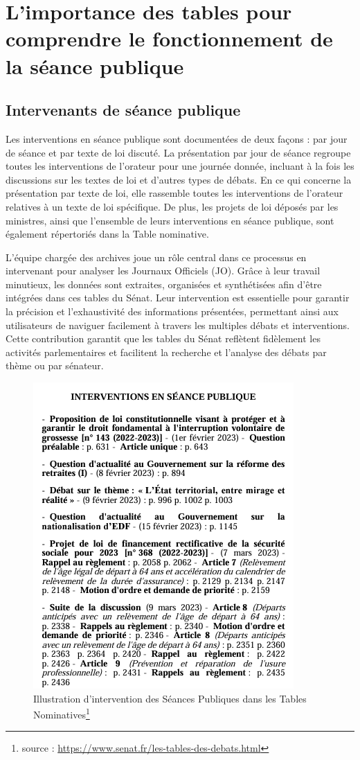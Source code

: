 \section{L'importance des tables pour comprendre le fonctionnement de la séance publique}
\subsection{Intervenants de séance publique}

Les interventions en séance publique sont documentées de deux façons : par jour de séance et par texte de loi discuté. La présentation par jour de séance regroupe toutes les interventions de l’orateur pour une journée donnée, incluant à la fois les discussions sur les textes de loi et d'autres types de débats. En ce qui concerne la présentation par texte de loi, elle rassemble toutes les interventions de l’orateur relatives à un texte de loi spécifique. De plus, les projets de loi déposés par les ministres, ainsi que l’ensemble de leurs interventions en séance publique, sont également répertoriés dans la Table nominative.

L’équipe chargée des archives joue un rôle central dans ce processus en intervenant pour analyser les Journaux Officiels (JO). Grâce à leur travail minutieux, les données sont extraites, organisées et synthétisées afin d'être intégrées dans ces tables du Sénat. Leur intervention est essentielle pour garantir la précision et l’exhaustivité des informations présentées, permettant ainsi aux utilisateurs de naviguer facilement à travers les multiples débats et interventions. Cette contribution garantit que les tables du Sénat reflètent fidèlement les activités parlementaires et facilitent la recherche et l’analyse des débats par thème ou par sénateur.

\begin{figure}[H]
    \centering
    \includegraphics[width=0.5\linewidth]{images/Interventions Séances Publiques.png}
    \caption{Illustration d'intervention des Séances Publiques dans les Tables Nominatives\protect\footnote{source : \url{https://www.senat.fr/les-tables-des-debats.html}}}
\end{figure}

